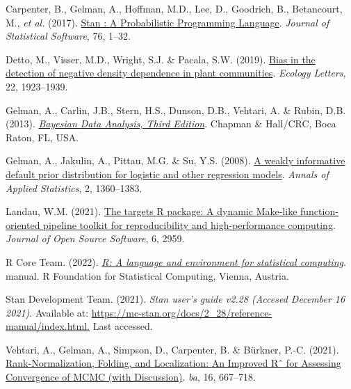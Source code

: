 \documentclass[
  12pt,
  letterpaper,
  DIV=11,
  numbers=noendperiod]{scrartcl}
\newlength{\cslhangindent}
\newlength{\cslentryspacingunit} %
\newenvironment{CSLReferences}[2] %
 {%
  \setlength{\parindent}{0pt}
  \ifodd #1
  \let\oldpar\par
  \def\par{\hangindent=\cslhangindent\oldpar}
  \fi
  \setlength{\parskip}{#2\cslentryspacingunit}
 }%
 {}
\begin{document}
\hypertarget{refs}{}
\begin{CSLReferences}{1}{0}
\leavevmode{}%
Carpenter, B., Gelman, A., Hoffman, M.D., Lee, D., Goodrich, B.,
Betancourt, M., \emph{et al.} (2017).
\href{https://doi.org/10.18637/jss.v076.i01}{Stan : {A Probabilistic
Programming Language}}. \emph{Journal of Statistical Software}, 76,
1--32.

\leavevmode{}%
Detto, M., Visser, M.D., Wright, S.J. \& Pacala, S.W. (2019).
\href{https://doi.org/10.1111/ele.13372}{Bias in the detection of
negative density dependence in plant communities}. \emph{Ecology
Letters}, 22, 1923--1939.

\leavevmode{}%
Gelman, A., Carlin, J.B., Stern, H.S., Dunson, D.B., Vehtari, A. \&
Rubin, D.B. (2013).
\emph{\href{https://books.google.com.pa/books?id=eSHSBQAAQBAJ}{Bayesian
{Data Analysis}, {Third Edition}}}. {Chapman \& Hall/CRC}, {Boca Raton,
FL, USA.}

\leavevmode{}%
Gelman, A., Jakulin, A., Pittau, M.G. \& Su, Y.S. (2008).
\href{https://doi.org/10.1214/08-AOAS191}{A weakly informative default
prior distribution for logistic and other regression models}.
\emph{Annals of Applied Statistics}, 2, 1360--1383.

\leavevmode{}%
Landau, W.M. (2021). \href{https://doi.org/10.21105/joss.02959}{The
targets {R} package: A dynamic {Make-like} function-oriented pipeline
toolkit for reproducibility and high-performance computing}.
\emph{Journal of Open Source Software}, 6, 2959.

\leavevmode{}%
R Core Team. (2022). \emph{\href{https://www.R-project.org/}{R: {A}
language and environment for statistical computing}}. manual. {R
Foundation for Statistical Computing}, {Vienna, Austria}.

\leavevmode{}%
Stan Development Team. (2021). \emph{Stan user's guide v2.28 ({Accesed
December} 16 2021)}. Available at:
\href{https://mc-stan.org/docs/2_28/reference-manual/index.html}{https://mc-stan.org/docs/2\_28/reference-manual/index.html.}
Last accessed.

\leavevmode{}%
Vehtari, A., Gelman, A., Simpson, D., Carpenter, B. \& Bürkner, P.-C.
(2021). \href{https://doi.org/10.1214/20-BA1221}{Rank-{Normalization},
{Folding}, and {Localization}: {An Improved Rˆ} for {Assessing
Convergence} of {MCMC} (with {Discussion})}. \emph{ba}, 16, 667--718.

\end{CSLReferences}
\end{document}
